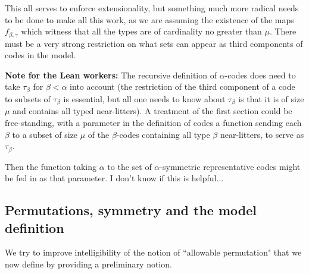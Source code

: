\documentclass[112pt]{article}
\begin{document}
This all serves to enforce extensionality, but something much more radical needs to be done to make all this work, as we are assuming the existence of the maps $f_{\beta,\gamma}$ which witness that all the types are of cardinality no greater than $\mu$.  There must be a very strong restriction on what sets can appear as third components of codes in the model.


{\bf Note for the Lean workers:}  The recursive definition of $\alpha$-codes does need to take $\tau_\beta$ for $\beta<\alpha$ into account
(the restriction of the third component of a code to subsets of $\tau_\beta$ is essential, but all one needs to know about $\tau_\beta$ is that it is
of size $\mu$ and contains all typed near-litters).  A treatment of the first section could be free-standing, with a parameter in the definition of codes
a function sending each $\beta$ to a subset of size $\mu$ of the $\beta$-codes containing all type $\beta$ near-litters, to serve as $\tau_\beta$.

Then the function taking $\alpha$ to the set of $\alpha$-symmetric representative codes might be fed in as that parameter.  I don't know if this is helpful...


\subsection{Permutations, symmetry and the model definition}

We try to improve intelligibility of the notion of ``allowable permutation" that we now define by providing a preliminary notion.
\end{document}
